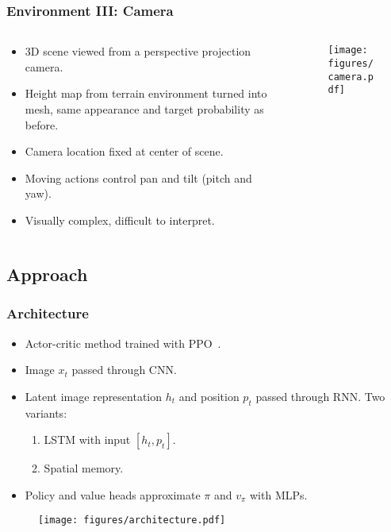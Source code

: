 \begin{frame}
    \frametitle{Environment III: Camera}
    \begin{columns}
        \begin{column}{0.5\textwidth}
            \begin{itemize}
                \item 3D scene viewed from a perspective projection camera.
                \item Height map from terrain environment turned into mesh, same appearance and target probability as before.
                \item Camera location fixed at center of scene.
                \item Moving actions control pan and tilt (pitch and yaw).
                \item Visually complex, difficult to interpret.
            \end{itemize}
        \end{column}
        \begin{column}{0.5\textwidth}
            \begin{figure}
                \centering
                \texttt{[image: figures/camera.pdf]}
            \end{figure}
        \end{column}
    \end{columns}
\end{frame}

\subsection{Approach}

\begin{frame}
    \frametitle{Architecture}

    \begin{itemize}
        \item Actor-critic method trained with PPO~\cite{schulman_proximal_2017}.
        \item Image \(x_t\) passed through CNN.
        \item Latent image representation \(h_t\) and position \(p_t\) passed through RNN. Two variants:
        \begin{enumerate}
            \item LSTM with input \(\left\lbrack h_t, p_t \right\rbrack\).
            \item Spatial memory.
        \end{enumerate}
        \item Policy and value heads approximate \(\pi\) and \(v_\pi\) with MLPs.
    \end{itemize}

    \begin{figure}
        \centering
        \texttt{[image: figures/architecture.pdf]}
    \end{figure}
\end{frame}

